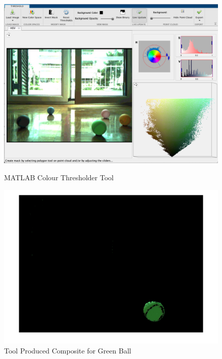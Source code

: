 \documentclass[a4paper]{article}
\begin{document}
\begin{figure}[H]
    \centering
    \begin{minipage}{.5\linewidth}
        \centering
        \includegraphics[scale=0.17]{./images/MatlabColourThresholder}
        \caption{MATLAB Colour Thresholder Tool}
        \label{image:MatlabColourThresholder}
    \end{minipage}\hfill
    \begin{minipage}{.5\linewidth}
        \centering
        \includegraphics[scale=0.18]{./images/GreenThreshold.png}
        \caption{Tool Produced Composite for Green Ball}
        \label{image:GreenThreshold}
    \end{minipage}
\end{figure}
\end{document}
